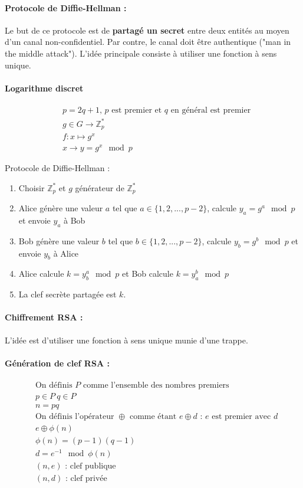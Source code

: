 \documentclass[11pt,a4paper]{report}
\begin{document}
\paragraph*{Protocole de Diffie-Hellman :}

Le but de ce protocole est de \textbf{partagé un secret} entre deux entités au moyen d'un canal non-confidentiel. Par contre, le canal doit être authentique ("man in the middle attack"). L'idée principale consiste à utiliser une fonction à sens unique.

\paragraph*{Logarithme discret}
\begin{align*}
& p = 2q + 1 \text{, $p$ est premier et $q$ en général est premier}\\
& g \in G \rightarrow \mathbb{Z}^*_p \\
& f : x \mapsto g^x \\
& x \longrightarrow y = g^x \mod p
\end{align*}

Protocole de Diffie-Hellman :
\begin{enumerate}
    \item Choisir $\mathbb{Z}^*_p$ et $g$ générateur de $\mathbb{Z}^*_p$
    \item Alice génère une valeur $a$ tel que $a\in\{1,2,...,p-2\}$, calcule $y_a=g^a\mod p$ et envoie $y_a$ à Bob
    \item Bob génère une valeur $b$ tel que $b\in\{1,2,...,p-2\}$,  calcule $y_b=g^b\mod p$ et envoie $y_b$ à Alice
    \item Alice calcule $k=y^a_b\mod p$ et Bob calcule $k=y^b_a \mod p$
    \item La clef secrète partagée est $k$.
\end{enumerate}

\paragraph*{Chiffrement RSA :}

L'idée est d'utiliser une fonction à sens unique munie d'une trappe.

\paragraph*{Génération de clef RSA :}
\begin{align*}
& \text{On définis $P$ comme l'ensemble des nombres premiers} \\
& p \in P \ q \in P \\
& n = pq \\
& \text{On définis l'opérateur $\oplus$ comme étant $e \oplus d$ : $e$ est premier avec $d$}\\
& e \oplus \phi(n) \\
& \phi(n) = (p-1)(q-1)\\
& d = e^{-1} \mod \phi(n)\\
& (n,e) \text{ : clef publique}\\
& (n,d) \text{ : clef privée}
\end{align*}
\end{document}
